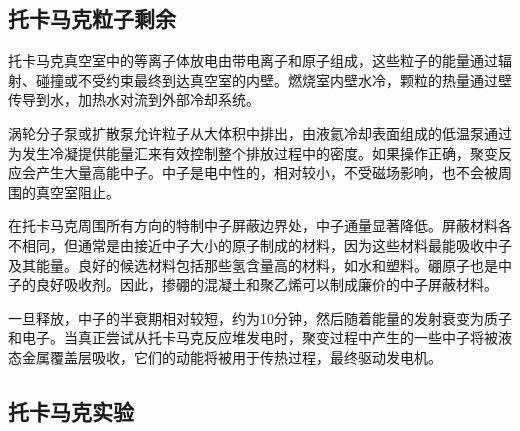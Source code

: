 \subsection{托卡马克粒子剩余}
托卡马克真空室中的等离子体放电由带电离子和原子组成，这些粒子的能量通过辐射、碰撞或不受约束最终到达真空室的内壁。燃烧室内壁水冷，颗粒的热量通过壁传导到水，加热水对流到外部冷却系统。

涡轮分子泵或扩散泵允许粒子从大体积中排出，由液氦冷却表面组成的低温泵通过为发生冷凝提供能量汇来有效控制整个排放过程中的密度。如果操作正确，聚变反应会产生大量高能中子。中子是电中性的，相对较小，不受磁场影响，也不会被周围的真空室阻止。

在托卡马克周围所有方向的特制中子屏蔽边界处，中子通量显著降低。屏蔽材料各不相同，但通常是由接近中子大小的原子制成的材料，因为这些材料最能吸收中子及其能量。良好的候选材料包括那些氢含量高的材料，如水和塑料。硼原子也是中子的良好吸收剂。因此，掺硼的混凝土和聚乙烯可以制成廉价的中子屏蔽材料。

一旦释放，中子的半衰期相对较短，约为10分钟，然后随着能量的发射衰变为质子和电子。当真正尝试从托卡马克反应堆发电时，聚变过程中产生的一些中子将被液态金属覆盖层吸收，它们的动能将被用于传热过程，最终驱动发电机。

\subsection{托卡马克实验}
